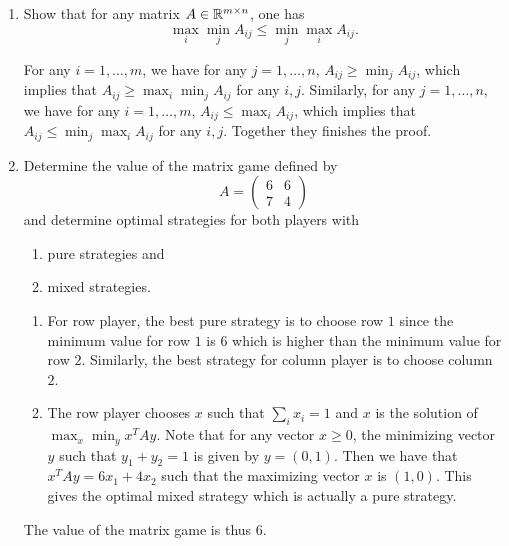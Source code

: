 \documentclass[11pt]{article}
\renewcommand{\leq}{\leqslant}
\renewcommand{\geq}{\geqslant}
\begin{document}
\begin{enumerate}[1)]
\item Show that for any matrix $A \in \mathbb{R}^{m\times n}$, one has
\begin{displaymath}
  \max_{i}\min_{j} A_{ij} \leq \min_{j}\max_{i} A_{ij}.
\end{displaymath}

\begin{solution}
For any $i=1,\dots, m$, we have for any $j=1,\dots, n$, $A_{ij} \geq \min_j A_{ij}$, which implies that $A_{ij} \geq \max_i \min_j A_{ij}$ for any $i,j$.
Similarly, for any $j=1,\dots, n$, we have for any $i=1,\dots, m$, $A_{ij} \leq \max_i A_{ij}$, which implies that $A_{ij} \leq \min_j \max_i A_{ij}$ for any $i,j$.
Together they finishes the proof.
\end{solution}

\item Determine the value of the matrix game defined by 
  \begin{displaymath}
    A =
    \begin{pmatrix}
      6 & 6 \\
      7 & 4
    \end{pmatrix}
  \end{displaymath}
and determine optimal strategies for both players with
\begin{enumerate}
\item pure strategies and 
\item mixed strategies.
\end{enumerate} 


\begin{solution}
\begin{enumerate}
\item For row player, the best pure strategy is to choose row $1$ since the minimum value for row $1$ is $6$ which is higher than the minimum value for row $2$. 
Similarly, the best strategy for column player is to choose column $2$.

\item The row player chooses $x$ such that $\sum_i x_i = 1$ and $x$ is the solution of $\max_x \min_y x^TAy$. Note that for any vector $x \geq 0$, the minimizing vector $y$ such that $y_1 + y_2 = 1$ is given by $y = (0, 1)$. Then we have that $x^TAy = 6x_1 + 4x_2$ such that the maximizing vector $x$ is $(1, 0)$. This gives the optimal mixed strategy which is actually a pure strategy.  
\end{enumerate}
The value of the matrix game is thus 6.
\end{solution}


\end{enumerate}
\end{document}
